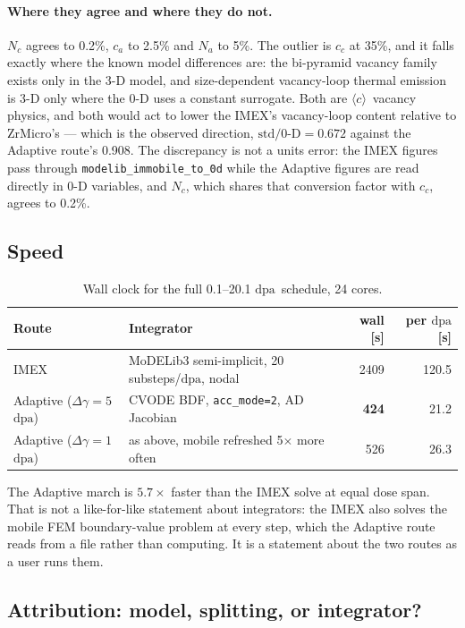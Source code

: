 \documentclass[11pt,a4paper]{article}
\newcommand{\code}[1]{\texttt{\small #1}}
\newcommand{\dpa}{\ensuremath{\mathrm{dpa}}}
\newcommand{\cloop}{\ensuremath{\langle c\rangle}}
\begin{document}
\paragraph{Where they agree and where they do not.} $N_c$ agrees to 0.2\%,
$c_a$ to 2.5\% and $N_a$ to 5\%. The outlier is $c_c$ at 35\%, and it falls
exactly where the known model differences are: the bi-pyramid vacancy family
exists only in the 3-D model, and size-dependent vacancy-loop thermal emission
is 3-D only where the 0-D uses a constant surrogate. Both are \cloop\ vacancy
physics, and both would act to lower the IMEX's vacancy-loop content
relative to ZrMicro's --- which is the observed direction, $\mathrm{std}/0\text{-D}=0.672$
against the Adaptive route's 0.908. The discrepancy is not a units error: the
IMEX figures pass through \code{modelib\_immobile\_to\_0d} while the
Adaptive figures are read directly in 0-D variables, and $N_c$, which shares that
conversion factor with $c_c$, agrees to 0.2\%.

\subsection{Speed}

\begin{table}[htb]
\centering
\caption{Wall clock for the full 0.1--20.1 \dpa\ schedule, 24 cores.}
\label{tab:tworoutespeed}
\begin{tabular}{llrr}
\toprule
Route & Integrator & wall [s] & per \dpa\ [s] \\
\midrule
IMEX & MoDELib3 semi-implicit, 20 substeps/\dpa, nodal & 2409 & 120.5 \\
Adaptive ($\Delta\gamma = 5$ \dpa) & CVODE BDF, \code{acc\_mode=2}, AD Jacobian & \textbf{424} & 21.2 \\
Adaptive ($\Delta\gamma = 1$ \dpa) & as above, mobile refreshed 5$\times$ more often & 526 & 26.3 \\
\bottomrule
\end{tabular}
\end{table}

The Adaptive march is $5.7\times$ faster than the IMEX solve at equal dose
span. That is not a like-for-like statement about integrators: the IMEX
also solves the mobile FEM boundary-value problem at every step, which the
Adaptive route reads from a file rather than computing. It is a statement about
the two routes as a user runs them.

\subsection{Attribution: model, splitting, or integrator?}
\label{sec:attrib}
\end{document}
